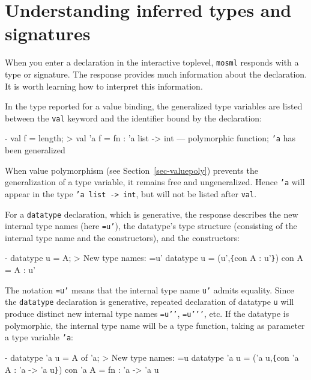 \documentclass[fleqn,a4paper]{article}
\begin{document}
\newpage

\section{Understanding inferred types and signatures}

When you enter a declaration in the interactive toplevel,
\texttt{mosml} responds with a type or signature.  The response
provides much information about the declaration.  It is worth learning
how to interpret this information.

In the type reported for a value binding, the generalized type
variables are listed between the \texttt{val} keyword and the
identifier bound by the declaration:

\begin{program}
- val f = length;
> val 'a f = fn : 'a list -> int        \rm{--- polymorphic function; \texttt{'a} has been generalized}
\end{program}

\noindent When value polymorphism (see
Section~\ref{sec-valuepoly}) prevents the generalization of a type
variable, it remains free and ungeneralized.  Hence \texttt{'a} will
appear in the type \texttt{'a list -> int}, but will not be listed
after \texttt{val}.

For a \texttt{datatype} declaration, which is generative, the response
describes the new internal type names (here \texttt{=u'}), the
datatype's type structure (consisting of the internal type name and
the constructors), and the constructors:

\begin{program}
- datatype u = A;
> New type names: =u'
  datatype u = (u',\verb+{+con A : u'\verb+}+)
  con A = A : u'
\end{program}

\noindent
The notation \texttt{=u'} means that the internal type name
\texttt{u'} admits equality.  Since the \texttt{datatype} declaration
is generative, repeated declaration of datatype \texttt{u} will
produce distinct new internal type names \texttt{=u{'}{'}},
\texttt{=u{'}{'}{'}}, etc.  If the datatype is polymorphic, the
internal type name will be a type function, taking as parameter a type
variable \texttt{'a}:

\begin{program}
- datatype 'a u = A of 'a;
> New type names: =u
  datatype 'a u = ('a u,\verb+{+con 'a A : 'a -> 'a u\verb+}+)
  con 'a A = fn : 'a -> 'a u
\end{program}
\end{document}
